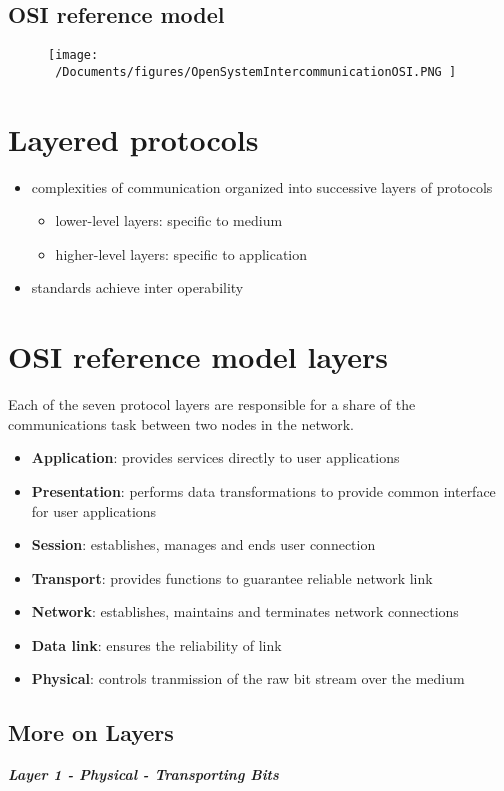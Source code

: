 \documentclass{report}
\begin{document}
\subsection{OSI reference model}
\begin{figure}[ht]
\centering
\texttt{[image:  ~/Documents/figures/OpenSystemIntercommunicationOSI.PNG ]}
\end{figure}
\section{Layered protocols}
\begin{itemize}
  \item complexities of communication organized into successive layers of protocols
    \begin{itemize}[label=$\circ$]
      \item lower-level layers: specific to medium
      \item higher-level layers: specific to application
    \end{itemize}
  \item standards achieve inter operability
\end{itemize}
\section{OSI reference model layers}
Each of the seven protocol layers are responsible for a share of the communications task between two nodes in the network.
\begin{itemize}
  \item \textbf{Application}: provides services directly to user applications
  \item \textbf{Presentation}: performs data transformations to provide common interface for user applications
  \item \textbf{Session}: establishes, manages and ends user connection
  \item \textbf{Transport}: provides functions to guarantee reliable network link
  \item \textbf{Network}: establishes, maintains and terminates network connections
  \item \textbf{Data link}: ensures the reliability of link
  \item \textbf{Physical}: controls tranmission of the raw bit stream over the medium
\end{itemize}
\subsection{More on Layers}
\textbf{\textit{Layer 1 - Physical - Transporting Bits}} \vspace{1.5mm}
\end{document}
